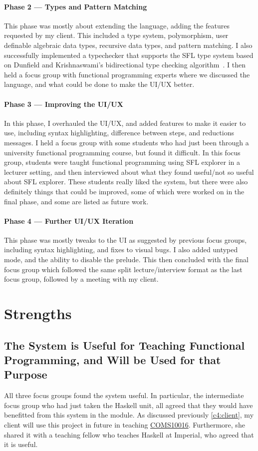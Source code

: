 \paragraph{Phase 2 --- Types and Pattern Matching} This phase was mostly about extending the language, adding the features requested by my client. This included a type system, polymorphism, user definable algebraic data types, recursive data types, and pattern matching. I also successfully implemented a typechecker that supports the \ac{SFL} type system based on Dunfield and Krishnaswami's bidirectional type checking algorithm~\cite{completebidir}. I then held a focus group with functional programming experts where we discussed the language, and what could be done to make the UI/UX better. 
\paragraph{Phase 3 --- Improving the UI/UX} In this phase, I overhauled the UI/UX, and added features to make it easier to use, including syntax highlighting, difference between steps, and reductions messages. I held a focus group with some students who had just been through a university functional programming course, but found it difficult. In this focus group, students were taught functional programming using SFL explorer in a lecturer setting, and then interviewed about what they found useful/not so useful about SFL explorer. These students really liked the system, but there were also definitely things that could be improved, some of which were worked on in the final phase, and some are listed as future work. 

\paragraph{Phase 4 --- Further UI/UX Iteration} This phase was mostly tweaks to the UI as suggested by previous focus groups, including syntax highlighting, and fixes to visual bugs. I also added untyped mode, and the ability to disable the prelude. This then concluded with the final focus group which followed the same split lecture/interview format as the last focus group, followed by a meeting with my client. 


\section{Strengths}
\subsection{The System is Useful for Teaching Functional Programming, and Will be Used for that Purpose}
All three focus groups found the system useful. In particular, the intermediate focus group who had just taken the Haskell unit, all agreed that they would have benefitted from this system in the module. 
As discussed previously \ref{c4:client}, my client will use this project in future in teaching \hyperref[COMS10016]{COMS10016}. Furthermore, she shared it with a teaching fellow who teaches Haskell at Imperial, who agreed that it is useful. 

